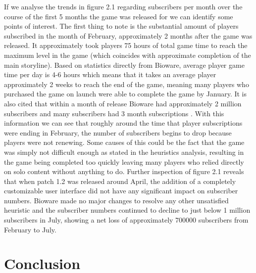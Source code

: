\documentclass[12pt]{report}
\begin{document}
If we analyse the trends in figure 2.1 regarding subscribers per month over the course of the first 5 months the game was released for we can identify some points of interest. The first thing to note is the substantial amount of players subscribed in the month of February, approximately 2 months after the game was released. It approximately took players 75 hours of total game time to reach the maximum level in the game\cite{Corwin} (which coincides with approximate completion of the main storyline). Based on statistics directly from Bioware, average player game time per day is 4-6 hours\cite{FredDutton} which means that it takes an average player approximately 2 weeks to reach the end of the game, meaning many players who purchased the game on launch were able to complete the game by January. It is also cited that within a month of release Bioware had approximately 2 million subscribers and many subscribers had 3 month subscriptions \cite{FredDutton}. With this information we can see that roughly around the time that player subscriptions were ending in February, the number of subscribers begins to drop because players were not renewing. Some causes of this could be the fact that the game was simply not difficult enough as stated in the heuristics analysis, resulting in the game being completed too quickly leaving many players who relied directly on solo content without anything to do. Further inspection of figure 2.1 reveals that when patch 1.2 was released around April, the addition of a completely customizable user interface did not have any significant impact on subscriber numbers. Bioware made no major changes to resolve any other unsatisfied heuristic and the subscriber numbers continued to decline to just below 1 million subscribers in July, showing a net loss of approximately 700000 subscribers from February to July.


\chapter{Conclusion}
\end{document}
